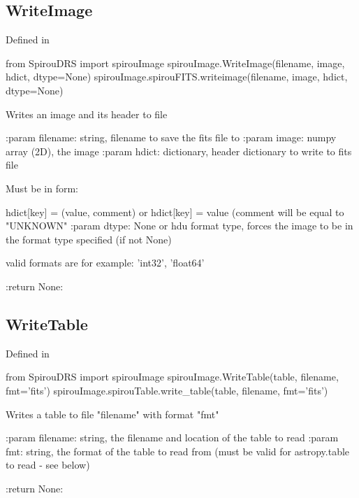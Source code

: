 \noindent\begin{minipage}{\textwidth}
\subsection{WriteImage}

Defined in \spirouImage{}

\begin{pythonbox}
from SpirouDRS import spirouImage
spirouImage.WriteImage(filename, image, hdict, dtype=None)
spirouImage.spirouFITS.writeimage(filename, image, hdict, dtype=None)
\end{pythonbox}

\begin{pythondocstring}
Writes an image and its header to file

:param filename: string, filename to save the fits file to
:param image: numpy array (2D), the image
:param hdict: dictionary, header dictionary to write to fits file

            Must be in form:

                    hdict[key] = (value, comment)
            or
                    hdict[key] = value     (comment will be equal to
                                            "UNKNOWN"
:param dtype: None or hdu format type, forces the image to be in the
              format type specified (if not None)

              valid formats are for example: 'int32', 'float64'

:return None:
\end{pythondocstring}
\end{minipage}


\noindent\begin{minipage}{\textwidth}
\subsection{WriteTable}

Defined in \spirouImage{}

\begin{pythonbox}
from SpirouDRS import spirouImage
spirouImage.WriteTable(table, filename, fmt='fits')
spirouImage.spirouTable.write_table(table, filename, fmt='fits')
\end{pythonbox}

\begin{pythondocstring}
Writes a table to file "filename" with format "fmt"

:param filename: string, the filename and location of the table to read
:param fmt: string, the format of the table to read from (must be valid
            for astropy.table to read - see below)

:return None:
\end{pythondocstring}
\end{minipage}


